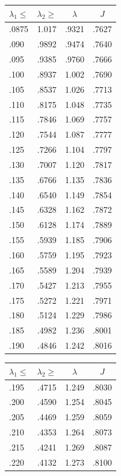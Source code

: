 \documentclass[12pt,psamsfonts]{amsart}
\theoremstyle{definition}
\theoremstyle{remark}
\numberwithin{equation}{section}
\begin{document}
\begin{table}
\begin{tabular}{l|c|c|c} 
 $\lambda_1 \leq$ & $\lambda_2 \geq$ & $\lambda$ & $J$ \\ 
 \hline 
 .0875 &  1.017 &  .9321 &  .7627 \\ 
 .090 &  .9892 &  .9474 &  .7640 \\ 
 .095 &  .9385 &  .9760 &  .7666 \\ 
 .100 &  .8937 &  1.002 &  .7690 \\ 
 .105 &  .8537 &  1.026 &  .7713 \\ 
 .110 &  .8175 &  1.048 &  .7735 \\ 
 .115 &  .7846 &  1.069 &  .7757 \\ 
 .120 &  .7544 &  1.087 &  .7777 \\ 
 .125 &  .7266 &  1.104 &  .7797 \\ 
 .130 &  .7007 &  1.120 &  .7817 \\ 
 .135 &  .6766 &  1.135 &  .7836 \\ 
 .140 &  .6540 &  1.149 &  .7854 \\ 
 .145 &  .6328 &  1.162 &  .7872 \\ 
 .150 &  .6128 &  1.174 &  .7889 \\ 
 .155 &  .5939 &  1.185 &  .7906 \\ 
 .160 &  .5759 &  1.195 &  .7923 \\ 
 .165 &  .5589 &  1.204 &  .7939 \\ 
 .170 &  .5427 &  1.213 &  .7955 \\ 
 .175 &  .5272 &  1.221 &  .7971 \\ 
 .180 &  .5124 &  1.229 &  .7986 \\ 
 .185 &  .4982 &  1.236 &  .8001 \\ 
  .190 &  .4846 &  1.242 &  .8016 \\ 
 \end{tabular}
 \qquad
 \begin{tabular}{l|c|c|c} 
 $\lambda_1 \leq$ & $\lambda_2 \geq$ & $\lambda$ & $J$ \\ 
 \hline 
 .195 &  .4715 &  1.249 &  .8030 \\ 
 .200 &  .4590 &  1.254 &  .8045 \\ 
 .205 &  .4469 &  1.259 &  .8059 \\ 
 .210 &  .4353 &  1.264 &  .8073 \\ 
 .215 &  .4241 &  1.269 &  .8087 \\ 
 .220 &  .4132 &  1.273 &  .8100 \\ 

\end{tabular}
\end{table}
\end{document}
